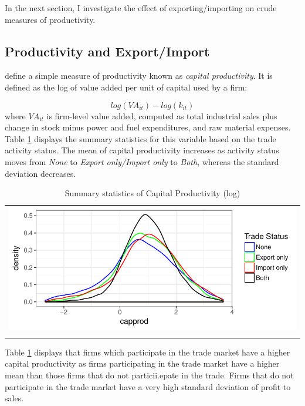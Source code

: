 \documentclass[12pt]{article}
\begin{document}
In the next section, I investigate the effect of exporting/importing on
crude measures of productivity.
 
\subsection{Productivity and Export/Import}

\textcite{gupta2018exporting} define a simple measure of productivity known
as \textit{capital productivity}. It is defined as the log of value added per
unit of capital used by a firm:

$$ log(VA_{it}) - log(k_{it})$$
where $VA_{it}$ is firm-level value added, computed as total industrial sales plus
change in stock minus power and fuel expenditures, and raw material
expenses. 
 Table \ref{tab:capprod} displays the summary statistics for this variable
based on the trade activity status. The mean of capital
productivity increases as activity status moves from \textit{None} to
\textit{Export only/Import only} to \textit{Both}, whereas the
standard deviation decreases.  
\begin{center}
\begin{table}[H]
\caption{Summary statistics of Capital Productivity (log)}
\label{tab:capprod}
\begin{tabular}{c}
 \includegraphics{./PICS/denscapprod.pdf}   \\ 
   \\  
\end{tabular}
\end{table}
\end{center}

  Table \ref{tab:capprod} displays that firms which participate in
the trade market  have a higher  capital productivity as firms
participating in the trade market have a higher mean than those firms
that do not particii.epate in the trade. Firms that do
not participate in the trade market have a very high standard
deviation of profit to sales.
\end{document}
